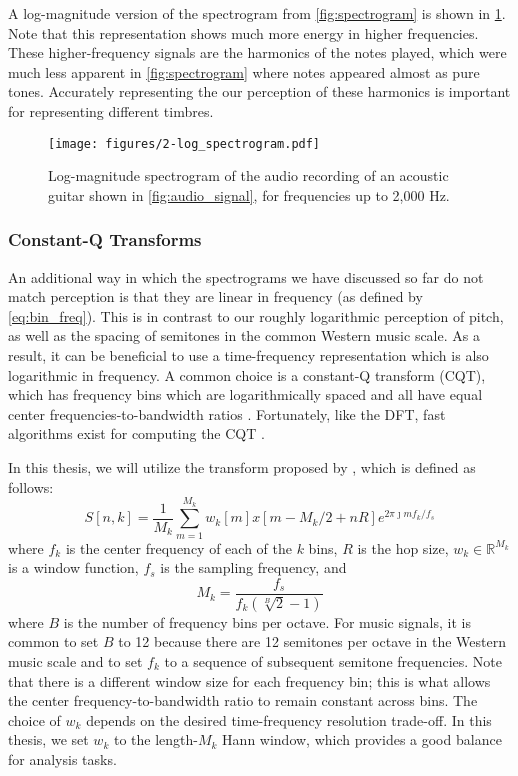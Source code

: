 A log-magnitude version of the spectrogram from \cref{fig:spectrogram} is shown in \cref{fig:log_spectrogram}.
Note that this representation shows much more energy in higher frequencies.
These higher-frequency signals are the harmonics of the notes played, which were much less apparent in \cref{fig:spectrogram} where notes appeared almost as pure tones.
Accurately representing the our perception of these harmonics is important for representing different timbres.

\begin{figure}
  \centering
  \texttt{[image: figures/2-log\_spectrogram.pdf]}
  \caption[Log-magnitude spectrogram of the acoustic guitar recording]{Log-magnitude spectrogram of the audio recording of an acoustic guitar shown in \cref{fig:audio_signal}, for frequencies up to 2,000 Hz.}
  \label{fig:log_spectrogram}
\end{figure}

\subsubsection{Constant-Q Transforms}
\label{sec:cqt}

An additional way in which the spectrograms we have discussed so far do not match perception is that they are linear in frequency (as defined by \cref{eq:bin_freq}).
This is in contrast to our roughly logarithmic perception of pitch, as well as the spacing of semitones in the common Western music scale.
As a result, it can be beneficial to use a time-frequency representation which is also logarithmic in frequency.
A common choice is a constant-Q transform (CQT), which has frequency bins which are logarithmically spaced and all have equal center frequencies-to-bandwidth ratios \cite{brown1991calculation}.
Fortunately, like the DFT, fast algorithms exist for computing the CQT \cite{brown1992efficient,schorkhuber2010constant}.

In this thesis, we will utilize the transform proposed by \cite{schorkhuber2010constant}, which is defined as follows:
\begin{equation}
        S[n, k] = \frac{1}{M_k} \sum_{m = 1}^{M_k} w_k[m]x[m - M_k/2 + nR] e^{2\pi \jmath m f_k/f_s}
\end{equation}
where $f_k$ is the center frequency of each of the $k$ bins, $R$ is the hop size, $w_k \in \mathbb{R}^{M_k}$ is a window function, $f_s$ is the sampling frequency, and
\begin{equation}
        M_k = \frac{f_s}{f_k (\sqrt[B]{2} - 1)}
\end{equation}
where $B$ is the number of frequency bins per octave.
For music signals, it is common to set $B$ to 12 because there are 12 semitones per octave in the Western music scale and to set $f_k$ to a sequence of subsequent semitone frequencies.
Note that there is a different window size for each frequency bin; this is what allows the center frequency-to-bandwidth ratio to remain constant across bins.
The choice of $w_k$ depends on the desired time-frequency resolution trade-off.
In this thesis, we set $w_k$ to the length-$M_k$ Hann window, which provides a good balance for analysis tasks.

